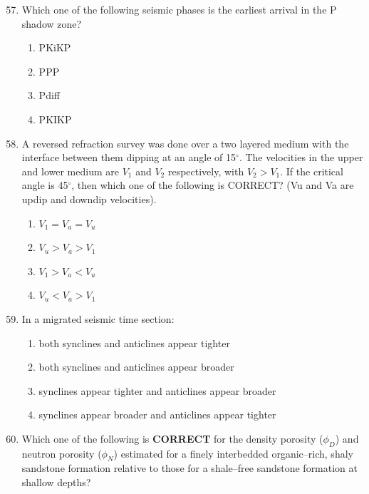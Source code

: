 \documentclass[journal,12pt,onecolumn]{IEEEtran}
\theoremstyle{remark}
\begin{document}
\begin{enumerate}
\setcounter{enumi}{56}

\item Which one of the following seismic phases is the earliest arrival in the P shadow zone?
\begin{multicols}{4}
\begin{enumerate}
\item PKiKP
\item PPP
\item Pdiff
\item PKIKP
\end{enumerate}
\end{multicols}

\item A reversed refraction survey was done over a two layered medium with the interface between them dipping at an angle of 15$^\circ$. The velocities in the upper and lower medium are $V_1$ and $V_2$ respectively, with $V_2 > V_1$. If the critical angle is 45$^\circ$, then which one of the following is CORRECT? (Vu and Va are updip and downdip velocities).
\begin{multicols}{4}
\begin{enumerate}
\item $V_1 = V_a = V_u$
\item $V_u > V_a > V_1$
\item $V_1 > V_a < V_u$
\item $V_u < V_a > V_1$
\end{enumerate}
\end{multicols}

\item In a migrated seismic time section:
\begin{enumerate}
\item both synclines and anticlines appear tighter
\item both synclines and anticlines appear broader
\item synclines appear tighter and anticlines appear broader
\item synclines appear broader and anticlines appear tighter
\end{enumerate}

\item Which one of the following is \textbf{CORRECT} for the density porosity ($\phi_D$) and neutron porosity ($\phi_N$) estimated for a finely interbedded organic--rich, shaly sandstone formation relative to those for a shale--free  sandstone formation at shallow depths?




\end{enumerate}
\end{document}

